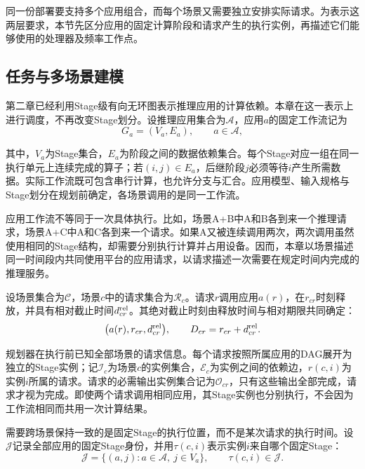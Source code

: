 同一份部署要支持多个应用组合，而每个场景又需要独立安排实际请求。为表示这两层要求，本节先区分应用的固定计算阶段和请求产生的执行实例，再描述它们能够使用的处理器及频率工作点。

\subsection{任务与多场景建模}

第二章已经利用Stage级有向无环图表示推理应用的计算依赖。本章在这一表示上进行调度，不再改变Stage划分。设推理应用集合为$\mathcal A$，应用$a$的固定工作流记为
\begin{equation}
G_a=(V_a,E_a),\qquad a\in\mathcal A,
\label{eq:application-dag}
\end{equation}

其中，$V_a$为Stage集合，$E_a$为阶段之间的数据依赖集合。每个Stage对应一组在同一执行单元上连续完成的算子；若$(i,j)\in E_a$，后继阶段$j$必须等待$i$产生所需数据。实际工作流既可包含串行计算，也允许分支与汇合。应用模型、输入规格与Stage划分在规划前确定，各场景调用的是同一工作流。

应用工作流不等同于一次具体执行。比如，场景A+B中A和B各到来一个推理请求，场景A+C中A和C各到来一个请求。如果A又被连续调用两次，两次调用虽然使用相同的Stage结构，却需要分别执行计算并占用设备。因而，本章以场景描述同一时间段内共同使用平台的应用请求，以请求描述一次需要在规定时间内完成的推理服务。

设场景集合为$\mathcal C$，场景$c$中的请求集合为$\mathcal R_c$。请求$r$调用应用$a(r)$，在$r_{cr}$时刻释放，并具有相对截止时间$d^{\rm rel}_{cr}$。其绝对截止时刻由释放时间与相对期限共同确定：
\begin{equation}
\bigl(a(r),r_{cr},d^{\rm rel}_{cr}\bigr),\qquad
D_{cr}=r_{cr}+d^{\rm rel}_{cr}.
\label{eq:request-description}
\end{equation}

规划器在执行前已知全部场景的请求信息。每个请求按照所属应用的DAG展开为独立的Stage实例；记$\mathcal I_c$为场景$c$的实例集合，$\mathcal E_c$为实例之间的依赖边，$r(c,i)$为实例$i$所属的请求。请求的必需输出实例集合记为$\mathcal O_{cr}$，只有这些输出全部完成，请求才视为完成。即使两个请求调用相同应用，其Stage实例也分别执行，不会因为工作流相同而共用一次计算结果。

需要跨场景保持一致的是固定Stage的执行位置，而不是某次请求的执行时间。设$\mathcal J$记录全部应用的固定Stage身份，并用$\tau(c,i)$表示实例$i$来自哪个固定Stage：
\begin{equation}
\mathcal J=\{(a,j):a\in\mathcal A,\ j\in V_a\},\qquad
\tau(c,i)\in\mathcal J.
\label{eq:stage-identity}
\end{equation}

